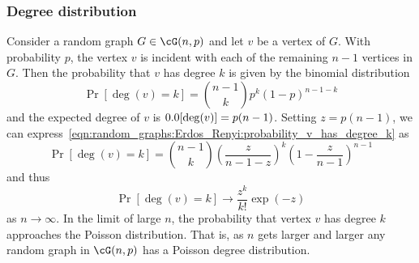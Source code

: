 
\subsubsection{Degree distribution}

Consider a random graph $G \in \cG(n,p)$ and let $v$ be a vertex of
$G$. With probability $p$, the vertex $v$ is incident with each of the
remaining $n - 1$ vertices in $G$. Then the probability that $v$ has
degree $k$ is given by the binomial
distribution
\begin{equation}
\label{eqn:random_graphs:Erdos_Renyi:probability_v_has_degree_k}
\Pr[\deg(v) = k]
=
\binom{n-1}{k} p^k (1 - p)^{n-1-k}
\end{equation}
and the expected degree of $v$ is $\E[\deg(v)] = p(n-1)$. Setting
$z = p(n-1)$, we can
express~\eqref{eqn:random_graphs:Erdos_Renyi:probability_v_has_degree_k}
as
\[
\Pr[\deg(v) = k]
=
\binom{n-1}{k}
\left( \frac{z} {n-1-z} \right)^k
\left( 1 - \frac{z}{n-1} \right)^{n-1}
\]
and thus
\[
\Pr[\deg(v) = k]
\to
\frac{z^k}{k!} \exp(-z)
\]
as $n \to \infty$. In the limit of large $n$, the probability that
vertex $v$ has degree $k$ approaches the
Poisson distribution. That is, as $n$ gets
larger and larger any random graph in $\cG(n,p)$ has a Poisson degree
distribution.




